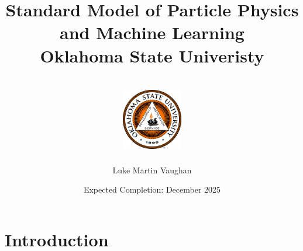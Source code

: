 \documentclass[12pt]{report}
\title{
  {Standard Model of Particle Physics\\ and Machine Learning}\\
  {\large Oklahoma State Univeristy}\\
  {\hfill}\\
  {\includegraphics[width=0.2\textwidth]{Oklahoma_State_University_seal.png}}
}
\author{Luke Martin Vaughan}
\date{Expected Completion: December 2025}
\begin{document}
\maketitle

\tableofcontents

\chapter{Introduction}

\end{document}
